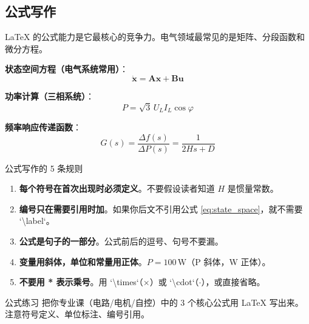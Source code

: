 \documentclass[12pt,a4paper]{ctexart}
\begin{document}
\subsection*{公式写作}

LaTeX 的公式能力是它最核心的竞争力。电气领域最常见的是矩阵、分段函数和微分方程。

\begin{tcolorbox}[colback=gray!5!white, colframe=gray!50!black, title=公式示例]
\textbf{状态空间方程（电气系统常用）}：
\begin{equation}
    \dot{\mathbf{x}} = \mathbf{A}\mathbf{x} + \mathbf{B}\mathbf{u}
    \label{eq:state_space}
\end{equation}

\textbf{功率计算（三相系统）}：
\begin{equation}
    P = \sqrt{3} \, U_L I_L \cos\varphi
    \label{eq:power_3phase}
\end{equation}

\textbf{频率响应传递函数}：
\begin{equation}
    G(s) = \frac{\Delta f(s)}{\Delta P(s)} = \frac{1}{2Hs + D}
    \label{eq:freq_response}
\end{equation}
\end{tcolorbox}

\begin{writingtip}{公式写作的 5 条规则}
    \begin{enumerate}
        \item \textbf{每个符号在首次出现时必须定义}。不要假设读者知道 $H$ 是惯量常数。
        \item \textbf{编号只在需要引用时加}。如果你后文不引用公式 \eqref{eq:state_space}，就不需要 `\textbackslash label`。
        \item \textbf{公式是句子的一部分}。公式前后的逗号、句号不要漏。
        \item \textbf{变量用斜体，单位和常量用正体}。$P=100\,\text{W}$（P 斜体，W 正体）。
        \item \textbf{不要用 * 表示乘号}。用 `\textbackslash times`（$\times$）或 `\textbackslash cdot`（$\cdot$），或直接省略。
    \end{enumerate}
\end{writingtip}

\begin{exercise}{公式练习}
    把你专业课（电路/电机/自控）中的 3 个核心公式用 LaTeX 写出来。注意符号定义、单位标注、编号引用。
\end{exercise}
\end{document}
